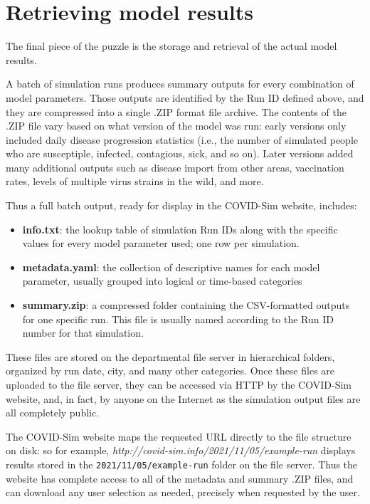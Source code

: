 \hypertarget{covid-retrieving-model-results}{%
\section{Retrieving model results}\label{retrieving-model-results}}

The final piece of the puzzle is the storage and retrieval of the actual model results.

A batch of simulation runs produces summary outputs for every combination of model parameters. Those outputs are identified by the Run ID defined above, and they are compressed into a single .ZIP format file archive. The contents of the .ZIP file vary based on what version of the model was run: early versions only included daily disease progression statistics (i.e., the number of simulated people who are susceptiple, infected, contagious, sick, and so on). Later versions added many additional outputs such as disease import from other areas, vaccination rates, levels of multiple virus strains in the wild, and more.

Thus a full batch output, ready for display in the COVID-Sim website,
includes:

\begin{itemize}
\item
  \textbf{info.txt}: the lookup table of simulation Run IDs along with the specific
  values for every model parameter used; one row per simulation.
\item
  \textbf{metadata.yaml}: the collection of descriptive names for each model parameter,
  usually grouped into logical or time-based categories
\item
  \textbf{summary.zip}: a compressed folder containing the CSV-formatted outputs for one
  specific run. This file is usually named according to the Run ID number for that simulation.
\end{itemize}

These files are stored on the departmental file server in hierarchical folders, organized by run date, city, and many other categories. Once these files are uploaded to the file server, they can be accessed via HTTP by the COVID-Sim website, and, in fact, by anyone on the Internet as the simulation output files are all completely public.

The COVID-Sim website maps the requested URL directly to the file structure on disk: so for example, \emph{http://covid-sim.info/2021/11/05/example-run} displays results stored in the \texttt{2021/11/05/example-run} folder on the file server. Thus the website has complete access to all of the metadata and summary .ZIP files, and can download any user selection as needed, precisely when requested by the user.

